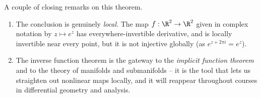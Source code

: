 \begin{remark}
    A couple of closing remarks on this theorem.
    \begin{enumerate}[label=(\roman*)]
        \item The conclusion is genuinely \emph{local}. The map $f: \R^2 \rightarrow \R^2$ given in complex notation by $z \mapsto e^z$ has everywhere-invertible derivative, and is locally invertible near every point, but it is not injective globally (as $e^{z + 2\pi i} = e^z$).
        \item The inverse function theorem is the gateway to the \emph{implicit function theorem} and to the theory of manifolds and submanifolds -- it is the tool that lets us straighten out nonlinear maps locally, and it will reappear throughout courses in differential geometry and analysis.
    \end{enumerate}
\end{remark}

